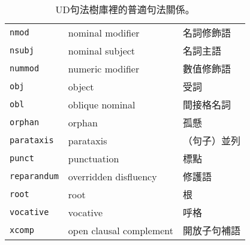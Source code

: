 \begin{table}[h!]
\begin{tabular}[t]{|l | l l|}
        \texttt{nmod} & nominal modifier & 名詞修飾語 \\
        \texttt{nsubj} & nominal subject & 名詞主語 \\
        \texttt{nummod} & numeric modifier & 數值修飾語 \\
        \texttt{obj} & object & 受詞 \\
        \texttt{obl} & oblique nominal & 間接格名詞 \\
        \texttt{orphan} & orphan & 孤懸 \\
        \texttt{parataxis} & parataxis & （句子）並列 \\
        \texttt{punct} & punctuation & 標點 \\
        \texttt{reparandum} & overridden disfluency & 修護語 \\
        \texttt{root} & root & 根 \\
        \texttt{vocative} & vocative & 呼格 \\
        \texttt{xcomp} & open clausal complement & 開放子句補語 \\
        \hline
    \end{tabular}
    \caption{UD句法樹庫裡的普適句法關係。}
    \label{tab:deprels}
    \end{table}